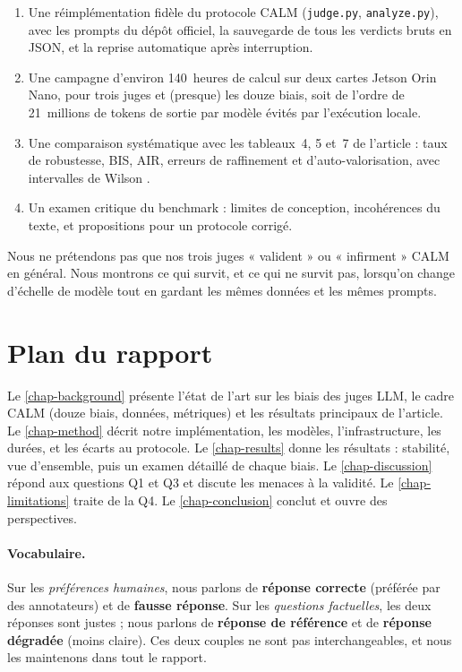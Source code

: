 \begin{enumerate}[leftmargin=1.6em]
  \item Une réimplémentation fidèle du protocole CALM (\texttt{judge.py}, \texttt{analyze.py}), avec les prompts du dépôt officiel, la sauvegarde de tous les verdicts bruts en JSON, et la reprise automatique après interruption.
  \item Une campagne d'environ 140~heures de calcul sur deux cartes Jetson Orin Nano, pour trois juges et (presque) les douze biais, soit de l'ordre de 21~millions de tokens de sortie par modèle évités par l'exécution locale.
  \item Une comparaison systématique avec les tableaux~4, 5 et~7 de l'article : taux de robustesse, BIS, AIR, erreurs de raffinement et d'auto-valorisation, avec intervalles de Wilson \cite{wilson1927}.
  \item Un examen critique du benchmark : limites de conception, incohérences du texte, et propositions pour un protocole corrigé.
\end{enumerate}

Nous ne prétendons pas que nos trois juges « valident » ou « infirment » CALM en général. Nous montrons ce qui survit, et ce qui ne survit pas, lorsqu'on change d'échelle de modèle tout en gardant les mêmes données et les mêmes prompts.

\section{Plan du rapport}

Le \cref{chap-background} présente l'état de l'art sur les biais des juges LLM, le cadre CALM (douze biais, données, métriques) et les résultats principaux de l'article. Le \cref{chap-method} décrit notre implémentation, les modèles, l'infrastructure, les durées, et les écarts au protocole. Le \cref{chap-results} donne les résultats : stabilité, vue d'ensemble, puis un examen détaillé de chaque biais. Le \cref{chap-discussion} répond aux questions Q1 et Q3 et discute les menaces à la validité. Le \cref{chap-limitations} traite de la Q4. Le \cref{chap-conclusion} conclut et ouvre des perspectives.

\paragraph{Vocabulaire.}
Sur les \emph{préférences humaines}, nous parlons de \textbf{réponse correcte} (préférée par des annotateurs) et de \textbf{fausse réponse}. Sur les \emph{questions factuelles}, les deux réponses sont justes ; nous parlons de \textbf{réponse de référence} et de \textbf{réponse dégradée} (moins claire). Ces deux couples ne sont pas interchangeables, et nous les maintenons dans tout le rapport.
